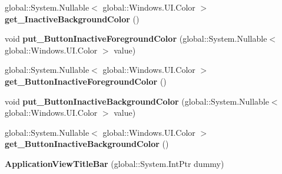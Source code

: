 \begin{DoxyCompactItemize}
\item 
\mbox{\label{class_windows_1_1_u_i_1_1_view_management_1_1_application_view_title_bar_aab1e5ef6e2bc37796640ab4cd4c4d182}} 
global\+::\+System.\+Nullable$<$ global\+::\+Windows.\+U\+I.\+Color $>$ {\bfseries get\+\_\+\+Inactive\+Background\+Color} ()
\item 
\mbox{\label{class_windows_1_1_u_i_1_1_view_management_1_1_application_view_title_bar_a24fc97928a847870e480f914ee47dfb5}} 
void {\bfseries put\+\_\+\+Button\+Inactive\+Foreground\+Color} (global\+::\+System.\+Nullable$<$ global\+::\+Windows.\+U\+I.\+Color $>$ value)
\item 
\mbox{\label{class_windows_1_1_u_i_1_1_view_management_1_1_application_view_title_bar_a4921101b9d4e1bf1aaadc876b4855657}} 
global\+::\+System.\+Nullable$<$ global\+::\+Windows.\+U\+I.\+Color $>$ {\bfseries get\+\_\+\+Button\+Inactive\+Foreground\+Color} ()
\item 
\mbox{\label{class_windows_1_1_u_i_1_1_view_management_1_1_application_view_title_bar_a61074bacb31ca090b2114fcd7d61167b}} 
void {\bfseries put\+\_\+\+Button\+Inactive\+Background\+Color} (global\+::\+System.\+Nullable$<$ global\+::\+Windows.\+U\+I.\+Color $>$ value)
\item 
\mbox{\label{class_windows_1_1_u_i_1_1_view_management_1_1_application_view_title_bar_abafef7d0cebc7bdecdff70332dd6c825}} 
global\+::\+System.\+Nullable$<$ global\+::\+Windows.\+U\+I.\+Color $>$ {\bfseries get\+\_\+\+Button\+Inactive\+Background\+Color} ()
\item 
\mbox{\label{class_windows_1_1_u_i_1_1_view_management_1_1_application_view_title_bar_a4b9382135e40d19c25f0633e1eea3e67}} 
{\bfseries Application\+View\+Title\+Bar} (global\+::\+System.\+Int\+Ptr dummy)
\item 
\mbox{\label{class_windows_1_1_u_i_1_1_view_management_1_1_application_view_title_bar_a32a06dddb589fcc84b37bbb52d2fef56}} 

\end{DoxyCompactItemize}
